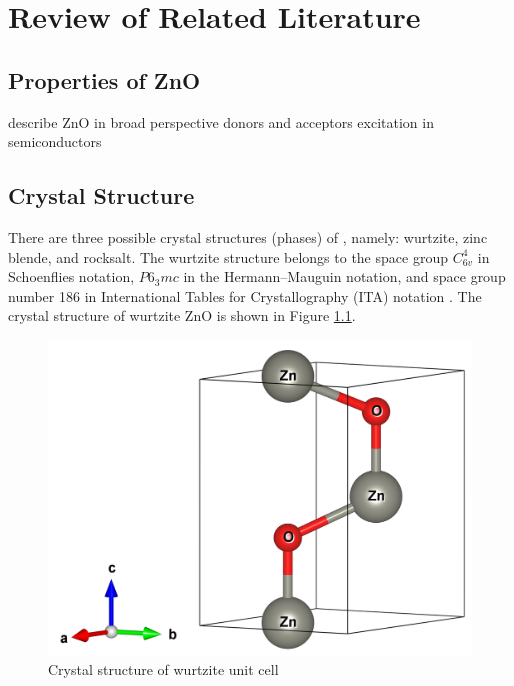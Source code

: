 \chapter{Review of Related Literature}
\section{Properties of ZnO}
	describe ZnO in broad perspective
	donors and acceptors
	excitation in semiconductors
\section{Crystal Structure}
There are three possible crystal structures (phases) of , namely: wurtzite, zinc blende, and rocksalt. The wurtzite structure belongs to the space group $C^4_{6v}$ in Schoenflies notation, $P6_3mc$ in the  Hermann–Mauguin notation, and space group number 186 in International Tables for Crystallography (ITA) notation \citep{Hahn2005}. The crystal structure of wurtzite ZnO is shown in Figure \ref{fig:ZnO_unit}.

\begin{figure}[tbh!] 
	\centering
	\includegraphics[width=0.5\linewidth]{"images/rrl/ZnO_unit"}
	\caption[Crystal structure of wurtzite  unit cell]{Crystal structure of wurtzite  unit cell}
	\label{fig:ZnO_unit}
\end{figure}

